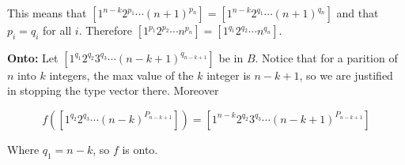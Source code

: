 \documentclass{article}
\begin{document}
This means that $[1^{n-k}2^{p_1}\cdots (n+1)^{p_n}] = [1^{n-k}2^{q_1}\cdots (n+1)^{q_n}]$ and that $p_i = q_i$ for all $i$. Therefore $[1^{p_1}2^{p_2}\cdots n^{p_n}] = [1^{q_1}2^{q_2}\cdots n^{q_n}]$.

\medskip
\textbf{Onto:} Let $[1^{q_1}2^{q_2}3^{q_3} \cdots (n-k+1)^{q_{n-k+1}}]$ be in $B$. Notice that for a parition of $n$ into $k$ integers, the max value of the $k$ integer is $n-k+1$, so we are justified in stopping the type vector there. Moreover

\begin{equation*}
    f([1^{q_2}2^{q_3}\cdots (n-k)^{P_{n-k+1}}]) = [1^{n-k}2^{q_2}3^{q_3} \cdots (n-k+1)^{P_{n-k+1}}]
\end{equation*}

Where $q_1 = n-k$, so $f$ is onto.
\end{document}
